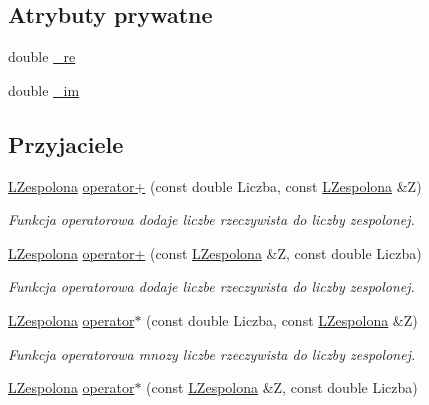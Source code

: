 \subsection*{Atrybuty prywatne}
\begin{DoxyCompactItemize}
\item 
double \hyperlink{class_l_zespolona_a2c047555071a543fbe6a25e7ccb949c8}{\_\-re}
\item 
double \hyperlink{class_l_zespolona_af9a4d283c2939ea8b427e1eb0358cb2c}{\_\-im}
\end{DoxyCompactItemize}
\subsection*{Przyjaciele}
\begin{DoxyCompactItemize}
\item 
\hyperlink{class_l_zespolona}{LZespolona} \hyperlink{class_l_zespolona_a48f8e9c2b37ad5b3b8b964c25346b930}{operator+} (const double Liczba, const \hyperlink{class_l_zespolona}{LZespolona} \&Z)
\begin{DoxyCompactList}\small\item\em Funkcja operatorowa dodaje liczbe rzeczywista do liczby zespolonej. \item\end{DoxyCompactList}\item 
\hyperlink{class_l_zespolona}{LZespolona} \hyperlink{class_l_zespolona_aef47f3e429efa18ade4555f77df27014}{operator+} (const \hyperlink{class_l_zespolona}{LZespolona} \&Z, const double Liczba)
\begin{DoxyCompactList}\small\item\em Funkcja operatorowa dodaje liczbe rzeczywista do liczby zespolonej. \item\end{DoxyCompactList}\item 
\hyperlink{class_l_zespolona}{LZespolona} \hyperlink{class_l_zespolona_a896efd2b35c96235e487819ad646aebb}{operator$\ast$} (const double Liczba, const \hyperlink{class_l_zespolona}{LZespolona} \&Z)
\begin{DoxyCompactList}\small\item\em Funkcja operatorowa mnozy liczbe rzeczywista do liczby zespolonej. \item\end{DoxyCompactList}\item 
\hyperlink{class_l_zespolona}{LZespolona} \hyperlink{class_l_zespolona_a7cc8baeda5b16a42f0a193d3fbaf0a64}{operator$\ast$} (const \hyperlink{class_l_zespolona}{LZespolona} \&Z, const double Liczba)

\end{DoxyCompactItemize}
